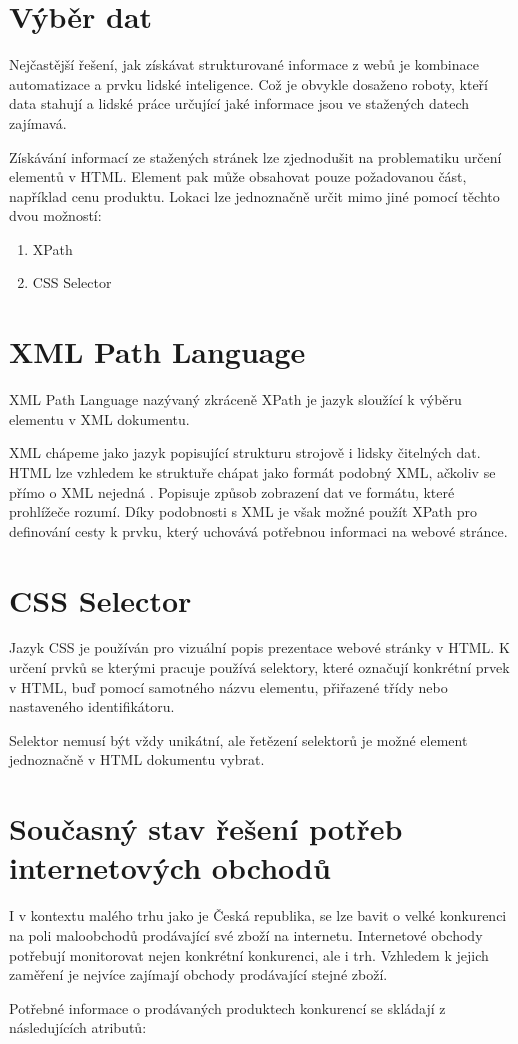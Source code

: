 \documentclass[thesis=B,czech]{FITthesis}[2012/06/26]
\begin{document}
\section{Výběr dat}
Nejčastější řešení, jak získávat strukturované informace z webů je kombinace automatizace a prvku lidské inteligence.
Což je obvykle dosaženo roboty, kteří data stahují a lidské práce určující jaké informace jsou ve stažených datech zajímavá.
\par
Získávání informací ze stažených stránek lze zjednodušit na problematiku určení elementů v HTML.
Element pak může obsahovat pouze požadovanou část, například cenu produktu.
Lokaci lze jednoznačně určit mimo jiné pomocí těchto dvou možností:
\begin{enumerate}
\item XPath
\item CSS Selector
\end{enumerate}


\section{XML Path Language}
XML Path Language\cite{XPath} nazývaný zkráceně XPath je jazyk sloužící k výběru elementu v  XML\cite{XML} dokumentu.
\par
XML chápeme jako jazyk popisující strukturu strojově i lidsky čitelných dat.
HTML lze vzhledem ke struktuře chápat jako formát podobný XML, ačkoliv se přímo o XML nejedná \cite{HTML}. 
Popisuje způsob zobrazení dat ve formátu, které prohlížeče rozumí.
Díky podobnosti s XML je však možné použít XPath pro definování cesty k prvku, který uchovává potřebnou informaci na webové stránce.
\par
\section{CSS Selector}
Jazyk CSS je používán pro vizuální popis prezentace webové stránky v HTML. K určení prvků se kterými
pracuje používá selektory, které označují konkrétní prvek v HTML, buď pomocí samotného názvu elementu, přiřazené třídy nebo nastaveného
identifikátoru.\cite{CSS}
\par
Selektor nemusí být vždy unikátní, ale řetězení selektorů je možné element jednoznačně v HTML dokumentu vybrat.

\newpage

\section{Současný stav řešení potřeb internetových obchodů}
I v kontextu malého trhu jako je Česká republika, se lze bavit o velké konkurenci na poli 
maloobchodů prodávající své zboží na internetu.
Internetové obchody potřebují monitorovat nejen konkrétní konkurenci, ale i trh. Vzhledem k jejich zaměření je nejvíce zajímají 
obchody prodávající stejné zboží. 
\par
Potřebné informace o prodávaných produktech konkurencí se skládají z následujících atributů:
\end{document}
